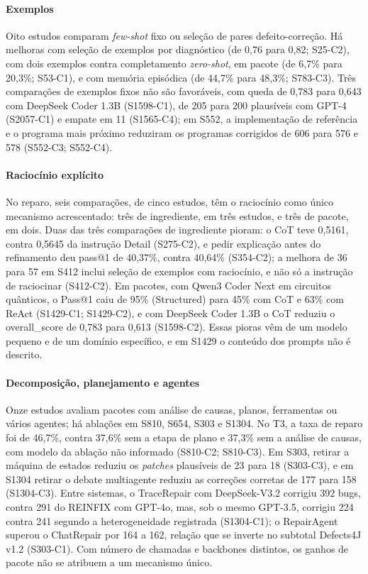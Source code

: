 \paragraph{Exemplos}
Oito estudos comparam \textit{few-shot} fixo ou seleção de pares defeito-correção.
Há melhoras com seleção de exemplos por diagnóstico (de 0,76 para 0,82; S25-C2), com dois exemplos contra completamento \textit{zero-shot}, em pacote (de 6,7\% para 20,3\%; S53-C1), e com memória episódica (de 44,7\% para 48,3\%; S783-C3).
Três comparações de exemplos fixos não são favoráveis, com queda de 0,783 para 0,643 com DeepSeek Coder 1.3B (S1598-C1), de 205 para 200 plausíveis com GPT-4 (S2057-C1) e empate em 11 (S1565-C4); em S552, a implementação de referência e o programa mais próximo reduziram os programas corrigidos de 606 para 576 e 578 (S552-C3; S552-C4).

\paragraph{Raciocínio explícito}
No reparo, seis comparações, de cinco estudos, têm o raciocínio como único mecanismo acrescentado: três de
ingrediente, em três estudos, e três de pacote, em dois.
Duas das três comparações de ingrediente pioram: o CoT teve 0,5161, contra 0,5645 da instrução Detail (S275-C2), e pedir explicação antes do refinamento deu pass@1 de 40,37\%, contra 40,64\% (S354-C2); a melhora de 36 para 57 em S412 inclui seleção de exemplos com raciocínio, e não só a instrução de raciocinar (S412-C2).
Em pacotes, com Qwen3 Coder Next em circuitos quânticos, o Pass@1 caiu de 95\% (Structured) para 45\% com CoT e 63\% com ReAct (S1429-C1; S1429-C2), e com DeepSeek Coder 1.3B o CoT reduziu o overall\_score de 0,783 para 0,613 (S1598-C2).
Essas pioras vêm de um modelo pequeno e de um domínio específico, e em S1429 o conteúdo dos prompts não é descrito.

\paragraph{Decomposição, planejamento e agentes}
Onze estudos avaliam pacotes com análise de causas, planos, ferramentas ou vários agentes; há ablações em S810, S654, S303 e S1304.
No T3, a taxa de reparo foi de 46,7\%, contra 37,6\% sem a etapa de plano e 37,3\% sem a análise de causas, com modelo da ablação não informado (S810-C2; S810-C3).
Em S303, retirar a máquina de estados reduziu os \textit{patches} plausíveis de 23 para 18 (S303-C3), e em S1304 retirar o debate multiagente reduziu as correções corretas de 177 para 158 (S1304-C3).
Entre sistemas, o TraceRepair com DeepSeek-V3.2 corrigiu 392 bugs, contra 291 do REINFIX com GPT-4o, mas, sob o mesmo GPT-3.5, corrigiu 224 contra 241 segundo a heterogeneidade registrada (S1304-C1); o RepairAgent superou o ChatRepair por 164 a 162, relação que se inverte no subtotal Defects4J v1.2 (S303-C1).
Com número de chamadas e backbones distintos, os ganhos de pacote não se atribuem a um mecanismo único.

